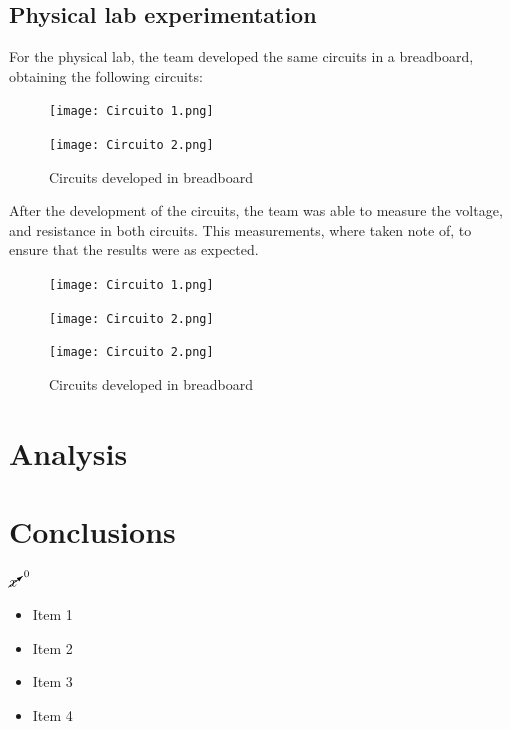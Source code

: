 \documentclass[12pt]{article}  %
\begin{document}
\subsection{Physical lab experimentation}
For the physical lab, the team developed the same circuits in a breadboard, obtaining the following circuits:
\begin{figure}[H]
  \centering
  \begin{minipage}{0.25\textwidth}
    \centering
    \texttt{[image: Circuito 1.png]}
  \end{minipage}
  \hspace{0.05\textwidth}
  \begin{minipage}{0.25\textwidth}
    \centering
    \texttt{[image: Circuito 2.png]}
  \end{minipage}
  \caption{Circuits developed in breadboard}
  \label{fig:breadboard_circuits}
\end{figure}
After the development of the circuits, the team was able to measure the voltage, and resistance in both circuits.
This measurements, where taken note of, to ensure that the results were as expected.
\begin{figure}[H]
  \centering
  \begin{minipage}{0.25\textwidth}
    \centering
    \texttt{[image: Circuito 1.png]}
  \end{minipage}
  \hspace{0.05\textwidth}
  \begin{minipage}{0.25\textwidth}
    \centering
    \texttt{[image: Circuito 2.png]}
  \end{minipage}
  \begin{minipage}{0.25\textwidth}
    \centering
    \texttt{[image: Circuito 2.png]}
  \end{minipage}
  \caption{Circuits developed in breadboard}
  \label{fig:breadboard_circuits}
\end{figure}
\section{Analysis} %
\section{Conclusions} %
\cite{gh1562} %

$\cancelto{0}{x}$ %
\begin{itemize}
    \item Item 1
    \item Item 2
    \item Item 3
    \item Item 4
\end{itemize}
\end{document}
